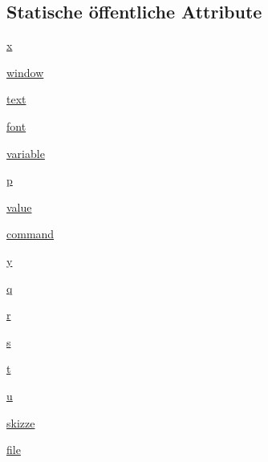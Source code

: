 \subsection*{Statische öffentliche Attribute}
\begin{DoxyCompactItemize}
\item 
\hyperlink{class_f_i_n_a_l___g_u_i___w_l_a_n_1_1_w_l_a_n_aeac6709da443ca41de175c549eb0caa7}{x}
\item 
\hyperlink{class_f_i_n_a_l___g_u_i___w_l_a_n_1_1_w_l_a_n_a720cbd5ab0bfa70f33b4df4d9eb5f1fb}{window}
\item 
\hyperlink{class_f_i_n_a_l___g_u_i___w_l_a_n_1_1_w_l_a_n_a0ae2586e259735d79d24bc6cf90028b6}{text}
\item 
\hyperlink{class_f_i_n_a_l___g_u_i___w_l_a_n_1_1_w_l_a_n_a6eeb65cc4d61327e371a6e387b1cdf2b}{font}
\item 
\hyperlink{class_f_i_n_a_l___g_u_i___w_l_a_n_1_1_w_l_a_n_a28d6012cc35be2a2cd22a5b076c8120d}{variable}
\item 
\hyperlink{class_f_i_n_a_l___g_u_i___w_l_a_n_1_1_w_l_a_n_acef6c9f6008d440075ab4c3abf3f1587}{p}
\item 
\hyperlink{class_f_i_n_a_l___g_u_i___w_l_a_n_1_1_w_l_a_n_a582d45150d973913b12e7254915d4ad9}{value}
\item 
\hyperlink{class_f_i_n_a_l___g_u_i___w_l_a_n_1_1_w_l_a_n_aae67fe842d0706519efdfb4555a5fefd}{command}
\item 
\hyperlink{class_f_i_n_a_l___g_u_i___w_l_a_n_1_1_w_l_a_n_a6104642e833ec3c75685f2632fc9de90}{y}
\item 
\hyperlink{class_f_i_n_a_l___g_u_i___w_l_a_n_1_1_w_l_a_n_aabd629581a558bbccec717f8ee9f6acf}{q}
\item 
\hyperlink{class_f_i_n_a_l___g_u_i___w_l_a_n_1_1_w_l_a_n_a061fd8c9d4ae910e85b9812ae59a3f5d}{r}
\item 
\hyperlink{class_f_i_n_a_l___g_u_i___w_l_a_n_1_1_w_l_a_n_a73feeffba511def562d112e6edfe2d27}{s}
\item 
\hyperlink{class_f_i_n_a_l___g_u_i___w_l_a_n_1_1_w_l_a_n_ac28a8c7fd724ed38e5845c69c365363b}{t}
\item 
\hyperlink{class_f_i_n_a_l___g_u_i___w_l_a_n_1_1_w_l_a_n_ab2291c1d64851272bbe945178b0d05b2}{u}
\item 
\hyperlink{class_f_i_n_a_l___g_u_i___w_l_a_n_1_1_w_l_a_n_a9c3477acb9bedac13149a4302e98b0c8}{skizze}
\item 
\hyperlink{class_f_i_n_a_l___g_u_i___w_l_a_n_1_1_w_l_a_n_a276f7d1e0be972de294dd7637470a407}{file}
\item 

\end{DoxyCompactItemize}
